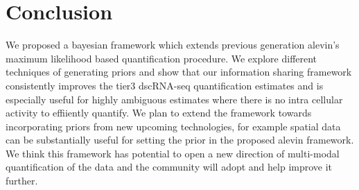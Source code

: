 \section{Conclusion}
We proposed a bayesian framework which extends previous generation alevin's maximum likelihood based 
quantification procedure. We explore different techniques of generating priors and show that our 
information sharing framework consistently improves the tier3 dscRNA-seq quantification estimates and 
is especially useful for highly ambiguous estimates where there is no intra cellular activity to 
effiiently quantify. We plan to extend the framework towards incorporating priors from new upcoming 
technologies, for example spatial data can be substantially useful for setting the prior in the proposed 
alevin framework.  We think this framework has potential to open a new direction of multi-modal 
quantification of the data and the community will adopt and help improve it further.
